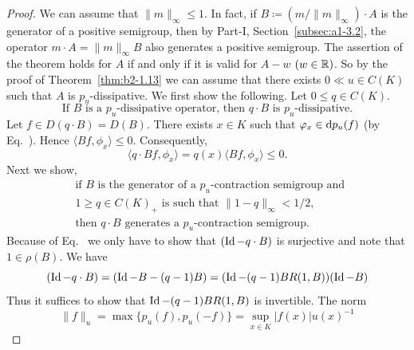\begin{proof}
We can assume that $\|m\|_{\infty} \leq 1$.
In fact, if\/ $B \coloneq (m/\|m\|_{\infty}) \cdot A$ is the generator of a positive semigroup, then by 
Part-I, Section~\ref{subsec:a1-3.2}, the operator $m \cdot A = \|m\|_{\infty}B$ also generates a positive semigroup.
The assertion of the theorem holds for $A$ if and only if it is valid for $A - w$ $(w \in \mathbb{R})$.
So by the proof of Theorem~\ref{thm:b2-1.13} we can assume that there exists $0 \ll u \in C(K)$ such that $A$ is $p_{u}$-dissipative.
We first show the following. Let $0 \leq  q \in C(K)$.
\begin{equation}\label{eq:b2-1.11}
\text{If } B \text{ is a } p_{u}\text{-dissipative operator, then } q \cdot B \text{ is } p_{u}\text{-dissipative.}
\end{equation}
Let $f \in D(q \cdot B) = D(B)$.
There exists $x \in K$ such that $\phi_{x} \in \ddp_{u}(f)$ (by Eq.~). 
Hence $\langle Bf,\phi_{x} \rangle \leq 0$.
Consequently, 
%
\[
	\langle q \cdot Bf,\phi_{x} \rangle = q(x)\langle Bf,\phi_{x} \rangle \leq 0 .
\]
%
Next we show,
\begin{equation}\label{eq:b2-1.12}
\begin{split}
&\text{if } B \text{ is the generator of a } p_{u}\text{-contraction semigroup and } \\
&1 \geq q \in C(K)_{+} \text{ is such that } \|1 - q\|_{\infty} < 1/2,  \\
&\text{then } q \cdot B \text{ generates a } p_{u}\text{-contraction semigroup.}
\end{split}
\end{equation}
Because of Eq.~ we only have to show that 
$(\operatorname{Id} - q \cdot B)$ is surjective and note that $1 \in \rho(B)$.
We have 
\[
	( \operatorname{Id} - q \cdot B) = (\operatorname{Id} - B - (q-1)B) = (\operatorname{Id} - (q-1)BR(1,B))(\operatorname{Id} - B)
\]
Thus it suffices to show that $\operatorname{Id} - (q-1)BR(1,B)$ is invertible.
The norm 
\[
	\|f\|_{u} = \max\{p_{u}(f), p_{u}(-f) \} = \sup_{x \in K} |f(x)| u(x)^{-1}
\]
\end{proof}
